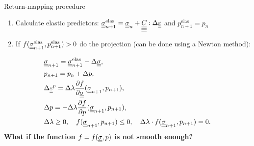 \documentclass[9pt]{beamer}
\begin{document}
\begin{frame}{Return-mapping procedure}
  \begin{enumerate}
    \item Calculate elastic predictors: $\underline{\underline{\sigma}}_{n+1}^{\text{elas}} = \underline{\underline{\sigma}}_n + \underline{\underline{\underline{\underline{C_{}}}}} : \Delta\underline{\underline{\varepsilon}}$ and $p^\text{elas}_{n+1} = p_n$ \label{eqn:return_mapping_begin}
    \item If $f(\underline{\underline{\sigma}}^\text{elas}_{n+1}, p^\text{elas}_{n+1}) > 0$ do the projection (can be done using a Newton method):
  \end{enumerate}
  \begin{align}
    & \uusigman = \uusigmanelas - \Delta\uusigma, \\
    & p_{n+1} = p_n + \Delta p, \\%
    & \Delta\uueps^p = \Delta\lambda\frac{\partial f}{\partial \uusigma} (\uusigman, p_{n+1}), \\
    & \Delta p = -\Delta\lambda\frac{\partial f}{\partial p} (\uusigman, p_{n+1}), \\
    & \Delta\lambda \geq 0, \quad f(\uusigman, p_{n+1}) \leq 0, \quad \Delta\lambda\cdot f(\uusigman, p_{n+1}) = 0. \label{eqn:return_mapping_end}
  \end{align}
  \textbf{What if the function $f = f(\underline{\underline{\sigma}}, p)$ is not smooth enough?}
\end{frame}
\end{document}
